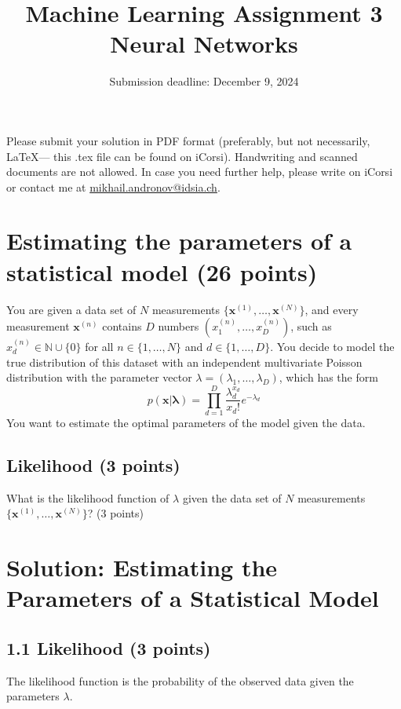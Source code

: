 \documentclass[a4paper,12pt]{article}
\title{Machine Learning Assignment 3\\
Neural Networks}
\date{Submission deadline: December 9, 2024}
\author{}
\begin{document}
\maketitle

\noindent Please submit your solution in PDF format (preferably, but not necessarily, \LaTeX --- this .tex file can be found on iCorsi). Handwriting and scanned documents are not allowed. 
In case you need further help, please write on iCorsi or contact me at \href{mailto:mikhail.andronov@idsia.ch}{mikhail.andronov@idsia.ch}.

\section{Estimating the parameters of a statistical model (26 points)}
You are given a data set of $N$ measurements $\{\mathbf{x}^{(1)}, \ldots, \mathbf{x}^{(N)}\}$, and every measurement $\mathbf{x}^{(n)}$ contains $D$ numbers $(x^{(n)}_1, \ldots, x^{(n)}_D)$, such as $x^{(n)}_d \in \mathbb{N} \cup \{0\}$ for all $n \in \{1, \ldots, N\}$ and $d \in \{1, \ldots, D\}$. You decide to model the true distribution of this dataset with an independent multivariate Poisson distribution with the parameter vector $\lambda = (\lambda_1, \ldots, \lambda_D)$, which has the form
\begin{equation}
    p(\mathbf{x} | \mathbf{\lambda}) = \prod_{d=1}^{D}\frac{\lambda_d^{x_d}}{x_d!}e^{-\lambda_d}
\end{equation}
You want to estimate the optimal parameters of the model given the data.

\subsection{Likelihood (3 points)}
What is the likelihood function of $\lambda$ given the data set of $N$ measurements $\{\mathbf{x}^{(1)}, \ldots, \mathbf{x}^{(N)}\}$?
(3 points)

\section*{Solution: Estimating the Parameters of a Statistical Model}

\subsection*{1.1 Likelihood (3 points)}
The likelihood function is the probability of the observed data given the parameters \(\lambda\).
\end{document}
